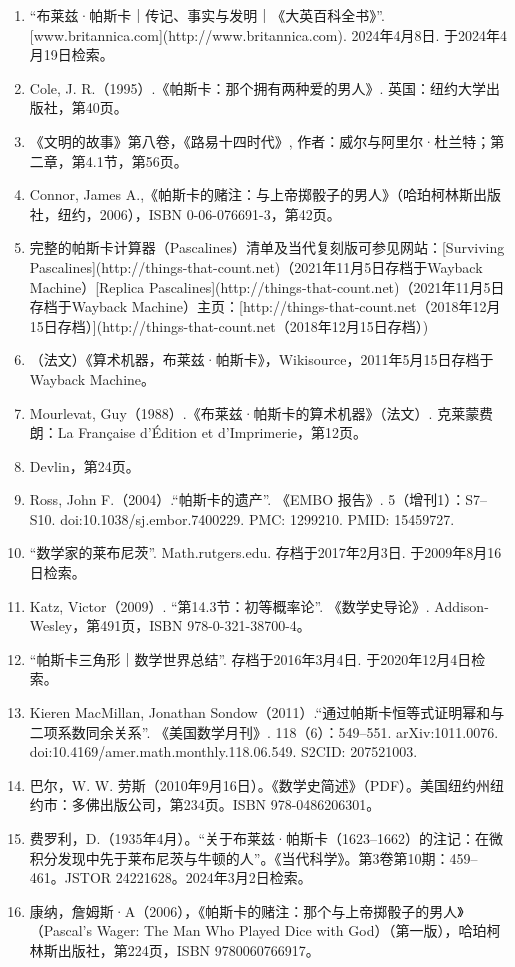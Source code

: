 \begin{enumerate}
\item “布莱兹·帕斯卡｜传记、事实与发明｜《大英百科全书》”. [www.britannica.com](http://www.britannica.com). 2024年4月8日. 于2024年4月19日检索。
\item Cole, J. R.（1995）.《帕斯卡：那个拥有两种爱的男人》. 英国：纽约大学出版社，第40页。
\item 《文明的故事》第八卷，《路易十四时代》, 作者：威尔与阿里尔·杜兰特；第二章，第4.1节，第56页。
\item Connor, James A.,《帕斯卡的赌注：与上帝掷骰子的男人》（哈珀柯林斯出版社，纽约，2006），ISBN 0-06-076691-3，第42页。
\item 完整的帕斯卡计算器（Pascalines）清单及当代复刻版可参见网站：[Surviving Pascalines](http://things-that-count.net)（2021年11月5日存档于Wayback Machine）[Replica Pascalines](http://things-that-count.net)（2021年11月5日存档于Wayback Machine）主页：[http://things-that-count.net（2018年12月15日存档）](http://things-that-count.net（2018年12月15日存档）)
\item （法文）《算术机器，布莱兹·帕斯卡》，Wikisource，2011年5月15日存档于Wayback Machine。
\item Mourlevat, Guy（1988）.《布莱兹·帕斯卡的算术机器》（法文）. 克莱蒙费朗：La Française d'Édition et d'Imprimerie，第12页。
\item Devlin，第24页。
\item Ross, John F.（2004）.“帕斯卡的遗产”. 《EMBO 报告》. 5（增刊1）：S7–S10. doi:10.1038/sj.embor.7400229. PMC: 1299210. PMID: 15459727.
\item “数学家的莱布尼茨”. Math.rutgers.edu. 存档于2017年2月3日. 于2009年8月16日检索。
\item Katz, Victor（2009）. “第14.3节：初等概率论”. 《数学史导论》. Addison-Wesley，第491页，ISBN 978-0-321-38700-4。
\item “帕斯卡三角形｜数学世界总结”. 存档于2016年3月4日. 于2020年12月4日检索。
\item Kieren MacMillan, Jonathan Sondow（2011）.“通过帕斯卡恒等式证明幂和与二项系数同余关系”. 《美国数学月刊》. 118（6）：549–551. arXiv:1011.0076. doi:10.4169/amer.math.monthly.118.06.549. S2CID: 207521003.
\item 巴尔，W. W. 劳斯（2010年9月16日）。《数学史简述》（PDF）。美国纽约州纽约市：多佛出版公司，第234页。ISBN 978-0486206301。
\item 费罗利，D.（1935年4月）。“关于布莱兹·帕斯卡（1623–1662）的注记：在微积分发现中先于莱布尼茨与牛顿的人”。《当代科学》。第3卷第10期：459–461。JSTOR 24221628。2024年3月2日检索。
\item 康纳，詹姆斯·A（2006），《帕斯卡的赌注：那个与上帝掷骰子的男人》（Pascal's Wager: The Man Who Played Dice with God）（第一版），哈珀柯林斯出版社，第224页，ISBN 9780060766917。

\end{enumerate}
